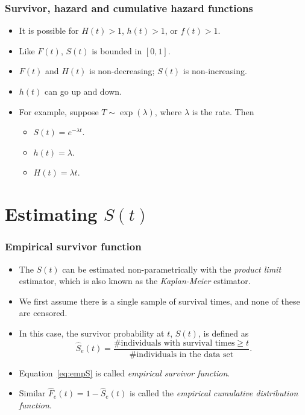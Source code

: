 \documentclass[10pt]{beamer}\usepackage[]{graphicx}\usepackage[]{color}
\newcommand{\empr}[1]{{\emph{\color{red}#1}}}
\begin{document}
\begin{frame}
  \frametitle{Survivor, hazard and cumulative hazard functions}
  \begin{itemize}
    \item It is possible for $H(t) > 1$, $h(t) > 1$, or $f(t) > 1$.
    \item Like $F(t)$, $S(t)$ is bounded in $[0, 1]$.
    \item $F(t)$ and $H(t)$ is non-decreasing; $S(t)$ is non-increasing.
    \item $h(t)$ can go up and down.
    \item For example, suppose $T\sim\exp(\lambda)$, where $\lambda$ is the rate. Then
      \begin{itemize}
      \item $S(t) = e^{-\lambda t}$.
      \item $h(t) = \lambda$.
      \item $H(t) = \lambda t$.
  \end{itemize}
\end{itemize}
\end{frame}

\section{Estimating $S(t)$}

\begin{frame}
  \frametitle{Empirical survivor function}
  \begin{itemize}
  \item The $S(t)$ can be estimated non-parametrically with the \empr{product limit} estimator, 
    which is also known as the \empr{Kaplan-Meier} estimator.
  \item We first assume there is a single sample of survival times, 
    and none of these are censored. 
  \item In this case, the survivor probability at $t$, $S(t)$, is defined as 
    \begin{equation}
      \hat S_e(t) = \frac{\mbox{\# individuals with survival times} \ge t}{\mbox{\# individuals in the data set}}.
        \label{eq:empS}
    \end{equation}
  \item Equation~\eqref{eq:empS} is called \empr{empirical survivor function}. 
  \item Similar $\hat F_e(t) = 1 - \hat S_e(t)$ is called the \empr{empirical cumulative distribution function}.
    \end{itemize}
\end{frame}
\end{document}
